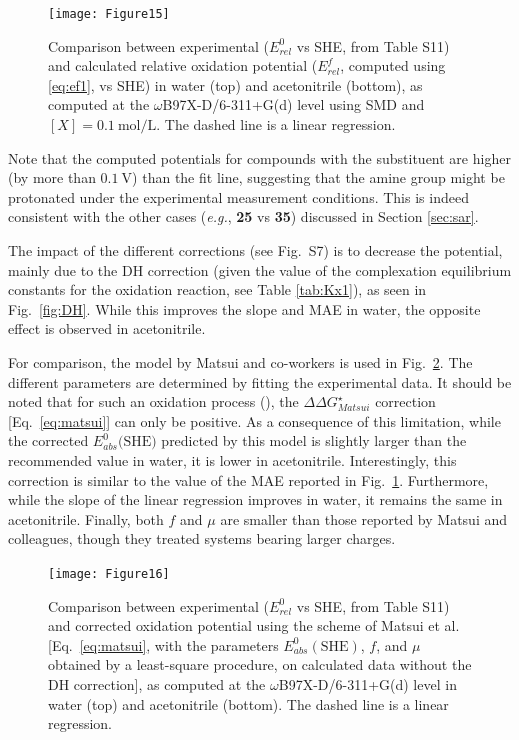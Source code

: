 \documentclass[review,preprint]{elsarticle}
\begin{document}
\begin{figure}[!h]
	\centering
	\texttt{[image: Figure15]}
	\caption{Comparison between experimental ($E^0_{rel} $ vs SHE, from Table S11) and  calculated relative oxidation potential ($E^f_{rel}$, computed using \eqref{eq:ef1}, vs SHE) in water (top) and acetonitrile (bottom), as computed at the $\omega$B97X-D/6-311+G(d) level using SMD and $[X]=\SI{0.1}{\mole\per\liter}$.  The dashed line is a linear regression.}
	\label{fig:expvstheo}
\end{figure}

Note that the computed potentials for compounds with the   substituent are higher (by more than $\SI{0.1}{\volt}$) than the fit line, suggesting that the amine group might be protonated under the experimental measurement conditions. This is indeed consistent with the other cases (\textit{e.g.}, \textbf{25} vs \textbf{35}) discussed in Section \ref{sec:sar}. 

The impact of the different corrections (see Fig.~S7) is to decrease the potential, mainly due to the DH correction (given the value of the complexation equilibrium constants for the oxidation reaction, see Table \ref{tab:Kx1}), as seen in Fig.~\ref{fig:DH}. While this improves the slope and MAE in water, the opposite effect is observed in acetonitrile.

For comparison, the model by Matsui and co-workers \cite{matsuiDensityFunctionalTheory2013} is used in Fig.~\ref{fig:matsui}. The different parameters are determined by fitting the experimental data. It should be noted that for such an oxidation process (), the $\Delta\Delta G^\star_{Matsui}$ correction [Eq.~\eqref{eq:matsui}] can only be positive. As a consequence of this limitation, while the corrected $E^0_{abs}(\text{SHE)}$  predicted by this model is slightly larger than the recommended value in water, it is lower in acetonitrile. Interestingly, this correction is similar to the value of the MAE reported in Fig.~\ref{fig:expvstheo}. Furthermore, while the slope of the linear regression improves in water, it remains the same in acetonitrile. Finally, both $f$ and $\mu$ are smaller than those reported by Matsui and colleagues, though they treated systems bearing larger charges.


\begin{figure}[!h]
	\centering
	\texttt{[image: Figure16]}
	\caption{Comparison between experimental ($E^0_{rel} $ vs SHE, from Table S11) and corrected oxidation potential using the scheme of Matsui et al. \cite{matsuiDensityFunctionalTheory2013} [Eq.~\eqref{eq:matsui}, with the parameters $E_{abs}^0(\text{SHE})$, $f$, and $\mu$ obtained by a least-square procedure, on calculated data without the DH correction], as computed at the $\omega$B97X-D/6-311+G(d) level in water (top) and acetonitrile (bottom). The dashed line is a linear regression. }
	\label{fig:matsui}
\end{figure}
\end{document}
